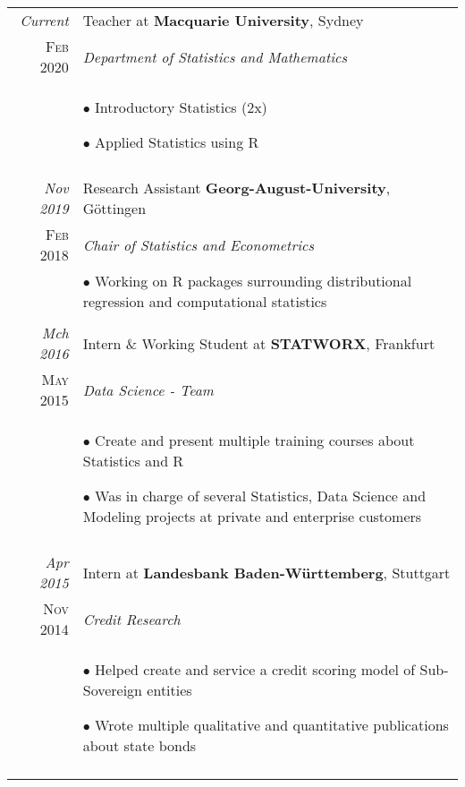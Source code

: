 \documentclass[a4paper,10pt]{article} %
\begin{document}
\begin{longtable}{r|p{10cm}}


  \emph{Current} & Teacher at \textbf{Macquarie University}, Sydney\\
  \textsc{Feb 2020} & \emph{Department of Statistics and Mathematics}\\
  & \footnotesize{$\bullet$ Introductory Statistics (2x)


  $\bullet$ Applied Statistics using R}\\
  \multicolumn{2}{c}{} \\


  \emph{Nov 2019} & Research Assistant \textbf{Georg-August-University}, Göttingen\\
  \textsc{Feb 2018} & \emph{Chair of Statistics and Econometrics}\\
  & \footnotesize{
  $\bullet$ Working on R packages surrounding distributional regression and computational statistics}\\
  \multicolumn{2}{c}{} \\


\emph{Mch 2016} & Intern \& Working Student at \textbf{STATWORX}, Frankfurt\\
\textsc{May 2015} & \emph{Data Science - Team} \\
& \footnotesize{$\bullet$ Create and present multiple training courses about Statistics and R

$\bullet$ Was in charge of several Statistics, Data Science and Modeling projects at private and enterprise customers}\\
\multicolumn{2}{c}{} \\


\emph{Apr 2015} & Intern at \textbf{Landesbank Baden-Württemberg}, Stuttgart\\
\textsc{Nov 2014} & \emph{Credit Research} \\
& \footnotesize{$\bullet$ Helped create and service a credit scoring model of Sub-Sovereign entities

$\bullet$ Wrote multiple qualitative and quantitative publications about state bonds}\\
\multicolumn{2}{c}{} \\


\end{longtable}
\end{document}
